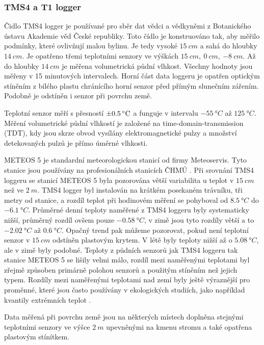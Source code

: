 \subsubsection{TMS4 a T1 logger} \label{chap:loggers}
Čidlo TMS4 logger je používané pro sběr dat vědci a vědkyněmi z Botanického ústavu Akademie věd České republiky. Toto čídlo je konstruováno tak, aby měřilo podmínky, které ovlivňují malou bylinu. Je tedy vysoké $\SI{15}{cm}$ a sahá do hloubky $\SI{14}{cm}$. Je opatřeno třemi teplotními senzory ve výškách $\SI{15}{cm},\ \SI{0}{cm},\ \SI{-8}{cm}$. Až do hloubky $\SI{14}{cm}$ je měřena volumetrická půdní vlhkost. Všechny hodnoty jsou měřeny v 15 minutových intervalech. Horní část data loggeru je opatřen optickým stíněním z bílého plastu chránícího horní senzor před přímým slunečním zářením. Podobně je odstíněn i senzor při povrchu země. 

Teplotní senzor měří s přesností $\SI{\pm 0.5}{\degree C}$ a funguje v intervalu $\SI{-55}{\degree C}$ až $\SI{125}{\degree C}$. Měření volumetrické půdní vlhkostí je založené na time-domain-transmission (TDT), kdy jsou skrze obvod vysílány elektromagnetické pulzy a množství detekovaných pulzů je přímo úměrné vlhkosti. 

METEOS 5 je standardní meteorologickou stanicí od firmy Meteoservis. Tyto stanice jsou používány na profesionálních stanicích ČHMÚ \parencite{meteos5}. Při srovnání TMS4 loggeru se stanicí METEOS 5 byla pozorována větší variabilita u teplot v $\SI{15}{cm}$ než ve $\SI{2}{m}$. TMS4 logger byl instalován na krátkém posekaném trávníku, tři metry od stanice, a rozdíl teplot při hodinovém měření se pohyboval od $\SI{+8.5}{\degree C}$ do $\SI{-6.1}{\degree C}$. Průměrné denní teploty naměřené z TMS4 loggeru byly systematicky nižší, průměrný rozdíl ovšem pouze $\SI{-0.58}{\degree C}$, v zimě jsou tyto rozdíly větší a to $\SI{-2.02}{\degree C}$ až $\SI{0.6}{\degree C}$. Opačný trend pak můžeme pozorovat, pokud není teplotní senzor v $\SI{15}{cm}$ odstíněn plastovým krytem. V létě byly teploty nižší až o $\SI{5.08}{\degree C}$, ale v zimě byly podobné. Teploty z půdních senzorů jak TMS4 loggeru tak stanice METEOS 5 se lišily velmi málo, rozdíl mezi naměřenými teplotami byl zřejmě způsoben primárně polohou senzorů a použitým stíněním než jejich typem. Rozdíly mezi naměřenými teplotami nad zemí byly ještě výraznější pro proměnné, které jsou často používány v ekologických studiích, jako například kvantily extrémních teplot \parencite{WildJan2019Caer}. 

Data měřená při povrchu země jsou na některých místech doplněna stejnými teplotními senzory ve výšce $\SI{2}{m}$ upevněnými na kmenu stromu a také opatřena plastovým stínítkem.

